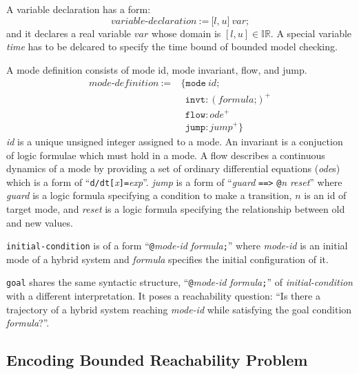 A variable declaration has a form:
\[
\textit{variable-declaration} \ := \ \texttt{[}
                                     \textit{l}
                                     \texttt{,}
                                     \ \textit{u}
                                     \texttt{]}
                                     \ \textit{var}
                                     \texttt{;}
\]
and it declares a real variable $var$ whose domain is $[l, u] \in
\mathbb{IR}$. A special variable \textit{time} has to be delcared to
specify the time bound of bounded model checking.

A mode definition consists of mode id, mode invariant, flow, and jump.
\begin{align*}
  \textit{mode-definition} \ := & \ \texttt{\{}
                                    \texttt{mode} \ \textit{id}\texttt{;}\\
                           & \ \ \  \texttt{invt}:(\textit{formula} \texttt{;})^+\\
                           & \ \ \  \texttt{flow}:\textit{ode}^+\\
                           & \ \ \ \texttt{jump}:\textit{jump}^+ \texttt{\}}
\end{align*}
\textit{id} is a unique unsigned integer assigned to a mode. An
invariant is a conjuction of logic formulae which must hold in a mode.
A flow describes a continuous dynamics of a mode by providing a set of
ordinary differential equations (\textit{ode}s) which is a form of
``\texttt{d/dt[}\textit{x}\texttt{]=}\textit{exp}''. \textit{jump} is
a form of ``\textit{guard} \texttt{==>} \texttt{@}\textit{n}
\textit{reset}'' where \textit{guard} is a logic formula specifying a
condition to make a transition, $n$ is an id of target mode, and
\textit{reset} is a logic formula specifying the relationship between
old and new values.

\texttt{initial-condition} is of a form
``\texttt{@}\textit{mode-id} \textit{formula}\texttt{;}''
where \textit{mode-id} is an initial mode of a hybrid system and
\textit{formula} specifies the initial configuration of it.

\texttt{goal} shares the same syntactic structure,
``\texttt{@}\textit{mode-id} \textit{formula}\texttt{;}'' of
\textit{initial-condition} with a different interpretation. It poses a
reachability question: ``Is there a trajectory of a hybrid system
reaching \textit{mode-id} while satisfying the goal condition \textit{formula}?''.

\subsection{Encoding Bounded Reachability Problem}
